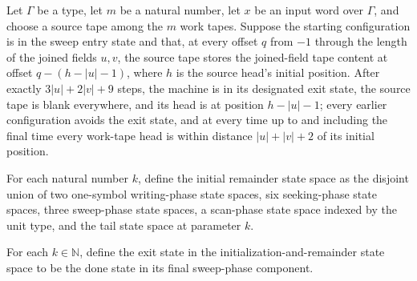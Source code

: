 \begin{theorem}
\label{Turing.rt_cleanTemplate_run}
\leanok
{}
Let $\Gamma$ be a type, let $m$ be a natural number, let $x$ be an input word over
$\Gamma$, and choose a source tape among the $m$ work tapes. Suppose the starting
configuration is in the sweep entry state and that, at every offset $q$ from $-1$
through the length of the joined fields $u,v$, the source tape stores the joined-field
tape content at offset $q-(h-|u|-1)$, where $h$ is the source head's initial position.
After exactly $3|u|+2|v|+9$ steps, the machine is in its designated exit state, the
source tape is blank everywhere, and its head is at position $h-|u|-1$; every earlier
configuration avoids the exit state, and at every time up to and including the final
time every work-tape head is within distance $|u|+|v|+2$ of its initial position.
\end{theorem}

\begin{definition}
\label{Turing.rt_initRestState}
\leanok
{}
For each natural number $k$, define the initial remainder state space as the disjoint
union of two one-symbol writing-phase state spaces, six seeking-phase state spaces,
three sweep-phase state spaces, a scan-phase state space indexed by the unit type, and
the tail state space at parameter $k$.
\end{definition}

\begin{definition}
\label{Turing.rt_initRestExit}
\leanok
{}
For each $k\in\mathbb N$, define the exit state in the initialization-and-remainder
state space to be the done state in its final sweep-phase component.
\end{definition}

